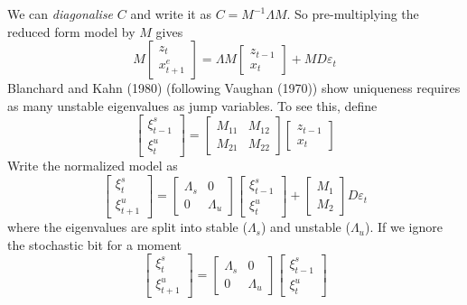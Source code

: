 \documentclass[
  letterpaper,
]{book}
\begin{document}
We can \emph{diagonalise} \(C\) and write it as \(C=M^{-1}\Lambda M\).
So pre-multiplying the reduced form model by \(M\) gives \[ 
M \begin{bmatrix} z_t \\ x_{t+1}^e \end{bmatrix} = \Lambda M \begin{bmatrix} z_{t-1} \\ x_t \end{bmatrix} + M D \varepsilon_t
\] Blanchard and Kahn (1980) (following Vaughan (1970)) show uniqueness
requires as many unstable eigenvalues as jump variables. To see this,
define \[
\begin{bmatrix} \xi_{t-1}^{s} \\  \xi_t^{u} \end{bmatrix}
  =  \begin{bmatrix} M_{11} & M_{12} \\  M_{21} & M_{22} \end{bmatrix}
      \begin{bmatrix} z_{t-1} \\  x_t \end{bmatrix}
\] Write the normalized model as \[
\begin{bmatrix} \xi_t^s \\ \xi_{t+1}^u \end{bmatrix}
 = \begin{bmatrix} \Lambda_s & 0 \\ 0 & \Lambda_u \end{bmatrix} 
\begin{bmatrix} \xi_{t-1}^s \\ \xi_t^u \end{bmatrix} +
\begin{bmatrix} M_1 \\ M_2 \end{bmatrix} D\varepsilon_t
\] where the eigenvalues are split into stable (\(\Lambda_s\)) and
unstable (\(\Lambda_u\)). If we ignore the stochastic bit for a moment
\[
\begin{bmatrix} \xi_t^s \\ \xi_{t+1}^u \end{bmatrix}
 = \begin{bmatrix} \Lambda_s & 0 \\ 0 & \Lambda_u \end{bmatrix} 
\begin{bmatrix} \xi_{t-1}^s \\ \xi_t^u \end{bmatrix}
\]
\end{document}
